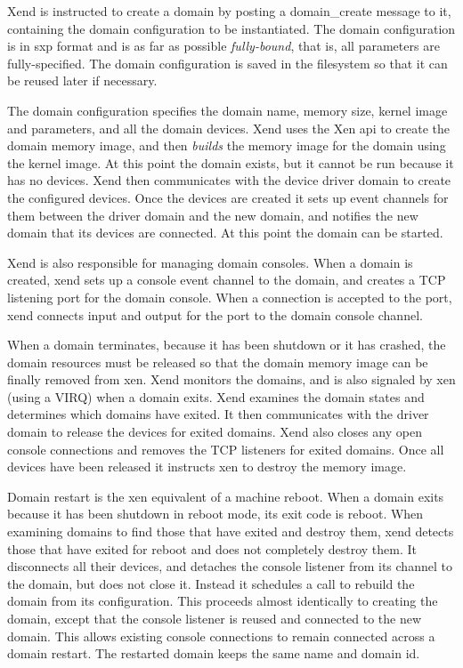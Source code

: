 \documentclass[11pt,twoside,final,openright]{xenstyle}
\begin{document}
Xend is instructed to create a domain by posting a domain\_create message to it,
containing the domain configuration to be instantiated. The domain configuration
is in sxp format and is as far as possible {\em fully-bound}, that is, all
parameters are fully-specified. The domain configuration is saved in the filesystem
so that it can be reused later if necessary.

The domain configuration specifies the domain name, memory size, kernel image
and parameters, and all the domain devices. Xend uses the Xen api to create
the domain memory image, and then {\em builds} the memory image for the domain
using the kernel image. At this point the domain exists, but it cannot be run because
it has no devices. Xend then communicates with the device driver domain to create
the configured devices. Once the devices are created it sets up event channels
for them between the driver domain and the new domain, and notifies the new domain
that its devices are connected. At this point the domain can be started.

Xend is also responsible for managing domain consoles. When a domain is created,
xend sets up a console event channel to the domain, and creates a TCP listening port
for the domain console. When a connection is accepted to the port, xend
connects input and output for the port to the domain console channel.

When a domain terminates, because it has been shutdown or it has crashed, the
domain resources must be released so that the domain memory image can be
finally removed from xen. Xend monitors the domains, and is also signaled by
xen (using a VIRQ) when a domain exits. Xend examines the domain states and
determines which domains have exited. It then communicates with the driver domain
to release the devices for exited domains. Xend also closes any open console
connections and removes the TCP listeners for exited domains.
Once all devices have been released it instructs xen to destroy the memory image.

Domain restart is the xen equivalent of a machine reboot. When a domain
exits because it has been shutdown in reboot mode, its exit code is reboot.
When examining domains to find those that have exited and destroy them,
xend detects those that have exited for reboot and does not completely destroy
them. It disconnects all their devices, and detaches the console listener
from its channel to the domain, but does not close it. Instead it schedules
a call to rebuild the domain from its configuration. This proceeds almost
identically to creating the domain, except that the console listener is
reused and connected to the new domain. This allows existing console
connections to remain connected across a domain restart. The restarted
domain keeps the same name and domain id.
\end{document}
